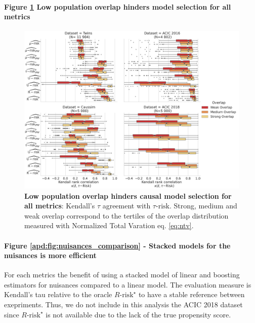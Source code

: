 \documentclass[french,12pt,twoside,a4paper]{book}
\begin{document}
\begin{appendices}
  \paragraph{Figure \ref{apd:fig:all_datasets_overlap_effect} Low population
    overlap hinders model selection for all metrics}



  \begin{figure}
    \centering
    \includegraphics[width=\textwidth]{img/chapter_5/_2_overlap_influence_overlap_by_bin_comparaison_kendall_by_Dataset.pdf}
    \hfill
    \caption{\textbf{Low population overlap hinders causal model selection for all
        metrics}:
      Kendall's $\tau$ agreement with $\tau\text{-risk}$. Strong, medium and weak overlap
      correspond
      to the tertiles of the overlap distribution measured with Normalized Total
      Varation eq. \ref{eq:ntv}.}\label{apd:fig:all_datasets_overlap_effect}
  \end{figure}


  \paragraph{Figure \ref{apd:fig:nuisances_comparison} - Stacked models for the nuisances is more efficient}
  For each metrics the benefit of
  using a stacked model of linear and boosting estimators for nuisances compared
  to a linear model. The evaluation measure is Kendall's tau relative to the
  oracle $R\text{-risk}^{\star}$ to have a stable reference between exepriments.
  Thus, we do not include in this analysis the ACIC 2018 dataset since
  $R\text{-risk}^{\star}$ is not available due to the lack of the true propensity
  score.


\end{appendices}
\end{document}
